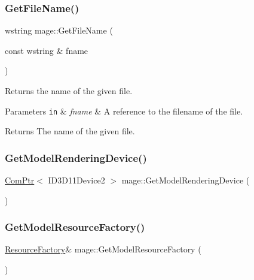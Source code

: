 \subsubsection{\texorpdfstring{Get\+File\+Name()}{GetFileName()}\hspace{0.1cm}{\footnotesize\ttfamily [2/2]}}
{\footnotesize\ttfamily wstring mage\+::\+Get\+File\+Name (\begin{DoxyParamCaption}\item[{const wstring \&}]{fname }\end{DoxyParamCaption})}

Returns the name of the given file.


\begin{DoxyParams}[1]{Parameters}
\mbox{\tt in}  & {\em fname} & A reference to the filename of the file. \\
\hline
\end{DoxyParams}
\begin{DoxyReturn}{Returns}
The name of the given file. 
\end{DoxyReturn}
\hypertarget{namespacemage_af12a2f088914281ec43dd91078c98a97}{}\label{namespacemage_af12a2f088914281ec43dd91078c98a97} 
\subsubsection{\texorpdfstring{Get\+Model\+Rendering\+Device()}{GetModelRenderingDevice()}}
{\footnotesize\ttfamily \hyperlink{namespacemage_ae74f374780900893caa5555d1031fd79}{Com\+Ptr}$<$ I\+D3\+D11\+Device2 $>$ mage\+::\+Get\+Model\+Rendering\+Device (\begin{DoxyParamCaption}{ }\end{DoxyParamCaption})}

\hypertarget{namespacemage_af3f71027fd2cac8d444bae0335fb8fb2}{}\label{namespacemage_af3f71027fd2cac8d444bae0335fb8fb2} 
\subsubsection{\texorpdfstring{Get\+Model\+Resource\+Factory()}{GetModelResourceFactory()}}
{\footnotesize\ttfamily \hyperlink{classmage_1_1_resource_factory}{Resource\+Factory}\& mage\+::\+Get\+Model\+Resource\+Factory (\begin{DoxyParamCaption}{ }\end{DoxyParamCaption})}

